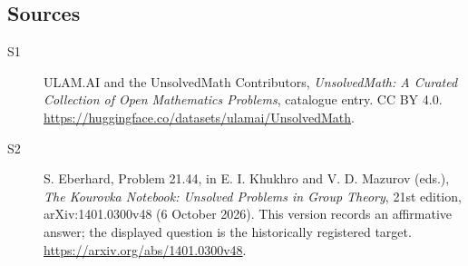 \documentclass[11pt]{article}
\begin{document}
\subsection{Sources}
\begin{description}
\item[\hypertarget{source:statement:1}{S1}] ULAM.AI and the UnsolvedMath Contributors, \emph{UnsolvedMath: A Curated Collection of Open Mathematics Problems}, catalogue entry. CC BY 4.0. \url{https://huggingface.co/datasets/ulamai/UnsolvedMath}.
\item[\hypertarget{source:statement:2}{S2}] S. Eberhard, Problem 21.44, in E. I. Khukhro and V. D. Mazurov (eds.), \emph{The Kourovka Notebook: Unsolved Problems in Group Theory}, 21st edition, arXiv:1401.0300v48 (6 October 2026). This version records an affirmative answer; the displayed question is the historically registered target. \url{https://arxiv.org/abs/1401.0300v48}.
\end{description}
\label{end:statement}
\end{document}
